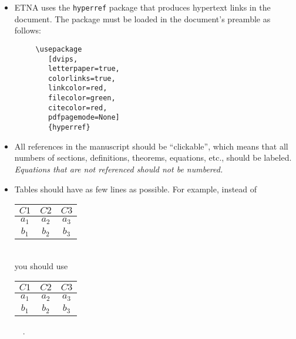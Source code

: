 \documentclass[10pt]{article}
\def\qed{~\vbox{\hrule\hbox{\vrule height1.3ex\hskip0.8ex\vrule}\hrule}}
\begin{document}
\begin{itemize}
%
\begin{verbatim}     \begin{proof} Text of the proof.  $\qquad$ \end{proof}\end{verbatim}
%
If the proof ends with a displayed equation you should use the following:
%
\begin{verbatim}
     {\em Proof}. Text of the proof.
     $$a^2+b^2=c^2. \qquad\endproof$$
\end{verbatim}
%
You can also generate a command for the ``endproof'' symbol by adding
%
\begin{verbatim}
     \def\qed{~\vbox{\hrule\hbox
        {\vrule height1.3ex\hskip0.8ex\vrule}\hrule}}
\end{verbatim}
%
to your tex-file. Typing {\tt \char`\\qed} in a formula then produces
the symbol $\qed\,$.
%
\item ETNA uses the {\tt hyperref} package that
produces hypertext links in the document. The package must be loaded
in the document's preamble as follows:
%
\begin{verbatim}
     \usepackage
        [dvips,
        letterpaper=true,
        colorlinks=true,
        linkcolor=red,
        filecolor=green,
        citecolor=red,
        pdfpagemode=None]
        {hyperref}
\end{verbatim}

\item All references in the manuscript should be ``clickable'', which
means that all numbers of sections, definitions, theorems, equations, etc.,
should be labeled. {\em Equations that are not referenced should not be numbered.}
%
\item Tables should have as few lines as possible. For example,
instead of\\

\hspace{2cm}\begin{tabular}{|c|c|c|}\hline
$C1$ & $C2$ & $C3$ \\ \hline
$a_1$ & $a_2$ & $a_3$ \\ \hline
$b_1$ & $b_2$ & $b_3$ \\ \hline
\end{tabular}\\

you should use\\

\hspace{2cm}\begin{tabular}{c|c|c}
$C1$ & $C2$ & $C3$ \\ \hline
$a_1$ & $a_2$ & $a_3$ \\
$b_1$ & $b_2$ & $b_3$
\end{tabular}~~.\\


\end{itemize}
\end{document}
